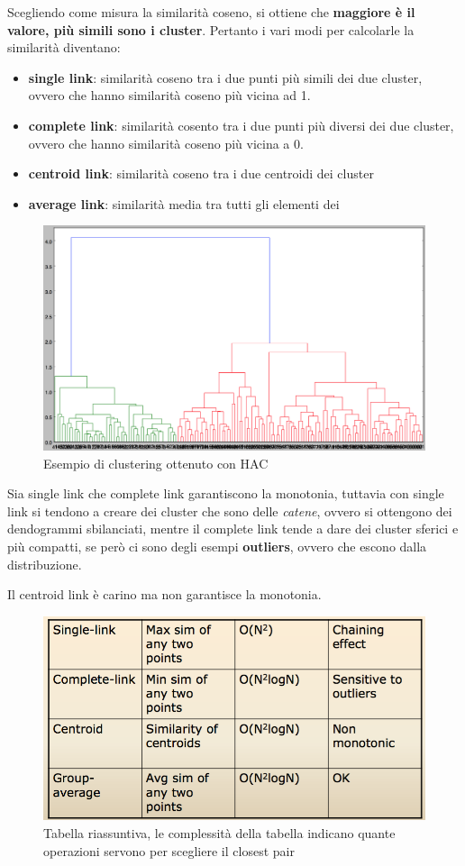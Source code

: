 Scegliendo come misura la similarità coseno, si ottiene che \textbf{maggiore è il valore, più simili sono i cluster}. Pertanto i vari modi per calcolarle la similarità diventano:

\begin{itemize}
	\item
	\textbf{single link}: similarità coseno tra i due punti più simili dei due cluster, ovvero che hanno similarità coseno più vicina ad 1.
	\item
	\textbf{complete link}: similarità cosento tra i due punti più diversi dei due cluster, ovvero che hanno similarità coseno più vicina a 0.
	\item
	\textbf{centroid link}: similarità coseno tra i due centroidi dei cluster
	\item
	\textbf{average link}: similarità media tra tutti gli elementi dei 
\end{itemize}

\begin{figure}[htbp]
\centering
\includegraphics[width=\textwidth]{./notes/immagini/l17-dendogram-cluster.png}
\caption{Esempio di clustering ottenuto con HAC}
\end{figure}

Sia single link che complete link garantiscono la monotonia, tuttavia
con single link si tendono a creare dei cluster che sono delle
\emph{catene}, ovvero si ottengono dei dendogrammi sbilanciati, mentre
il complete link tende a dare dei cluster sferici e più compatti, se
però ci sono degli esempi \textbf{outliers}, ovvero che escono dalla
distribuzione.

Il centroid link è carino ma non garantisce la monotonia.

\begin{figure}[htbp]
\centering
\includegraphics[width=\textwidth]{./notes/immagini/l17-riassunto.png}
\caption{Tabella riassuntiva, le complessità della tabella indicano quante operazioni servono per
	scegliere il closest pair}
\end{figure}
